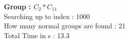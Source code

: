 \textbf{Group : $C_2*C_{11}$}\\
Searching up to index : 1000\\
How many normal groups are found : 21\\
Total Time in s : 13.3\\
